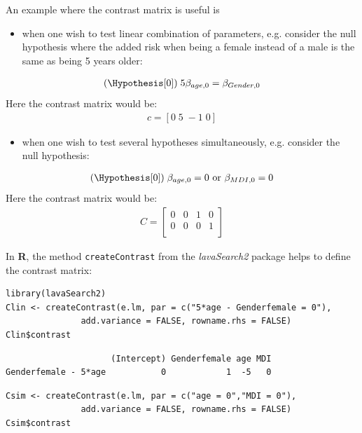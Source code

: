 \documentclass[12pt]{article}
\newcommand\Rlogo{\textbf{\textsf{R}}\xspace} %
\begin{document}
An example where the contrast matrix is useful is
\begin{itemize}
\item when one wish to test linear combination of parameters,
e.g. consider the null hypothesis where the added risk when being a
female instead of a male is the same as being 5 years older:
\end{itemize}
\begin{align*}
(\Hypothesis[0]) \; 5 \beta_{age,0} = \beta_{Gender,0}
\end{align*}
Here the contrast matrix would be:
\begin{align*}
c=[0 \; 5 \; -1 \; 0]
\end{align*}
\begin{itemize}
\item when one wish to test several hypotheses simultaneously,
e.g. consider the null hypothesis:
\end{itemize}
\begin{align*}
(\Hypothesis[0]) \; \beta_{age,0} = 0 \text{ or } \beta_{MDI,0} = 0 \\
\end{align*}
Here the contrast matrix would be:
\begin{align*}
C = \begin{bmatrix}
0 & 0 & 1 & 0 \\
0 & 0 & 0 & 1 \\
\end{bmatrix}
\end{align*}

\clearpage

In \Rlogo{}, the method \texttt{createContrast} from the \emph{lavaSearch2}
package helps to define the contrast matrix:
\lstset{language=r,label= ,caption= ,captionpos=b,numbers=none}
\begin{lstlisting}
library(lavaSearch2)
Clin <- createContrast(e.lm, par = c("5*age - Genderfemale = 0"),
		       add.variance = FALSE, rowname.rhs = FALSE)
Clin$contrast
\end{lstlisting}

\begin{verbatim}
                     (Intercept) Genderfemale age MDI
Genderfemale - 5*age           0            1  -5   0
\end{verbatim}

\lstset{language=r,label= ,caption= ,captionpos=b,numbers=none}
\begin{lstlisting}
Csim <- createContrast(e.lm, par = c("age = 0","MDI = 0"),
		       add.variance = FALSE, rowname.rhs = FALSE)
Csim$contrast
\end{lstlisting}
\end{document}
